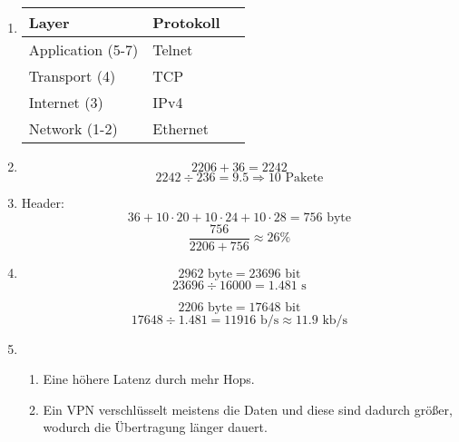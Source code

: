 \documentclass[a4paper, 12pt, margins=2cm]{homework}
\begin{document}
\newpage

  \begin{problem}
  \end{problem}
  \begin{solution}\hfill
    \begin{enumerate}[label=(\alph*)]\itemsep0pt
      \item \hfill
        \begin{center}
          \begin{tabular}{|m{4cm}|l|}
            \hline
            Layer             & Protokoll \\ \hline \hline
            Application (5-7) & Telnet    \\ \hline
            Transport (4)     & TCP       \\ \hline
            Internet (3)      & IPv4      \\ \hline
            Network (1-2)     & Ethernet$\qquad$  \\ \hline
          \end{tabular}
        \end{center}

      \item
        \[ 2206 + 36 = 2242 \]
        \[ 2242\div 236 = 9.5\Longrightarrow 10\text{ Pakete} \]

      \item \hfill 

        Header: 
        \[ 36+10\cdot 20+10\cdot 24+10\cdot 28 = 756\text{ byte} \]
        \[ \frac{756}{2206+756} \approx 26\%  \]

      \item
        \[ 2962\text{ byte} = 23696\text{ bit} \]
        \[ 23696\div 16000 = 1.481\text{ s} \]

        \[ 2206\text{ byte} = 17648\text{ bit} \]
        \[ 17648\div 1.481 = 11916\text{ b/s} \approx 11.9\text{ kb/s} \]

      \item \hfill
        \begin{enumerate}[label=\arabic*.]\itemsep0pt
          \item Eine höhere Latenz durch mehr Hops.
          \item Ein VPN verschlüsselt meistens die Daten und diese sind dadurch größer,
                wodurch die Übertragung länger dauert.
        \end{enumerate}
    \end{enumerate}
  \end{solution}
\end{document}
